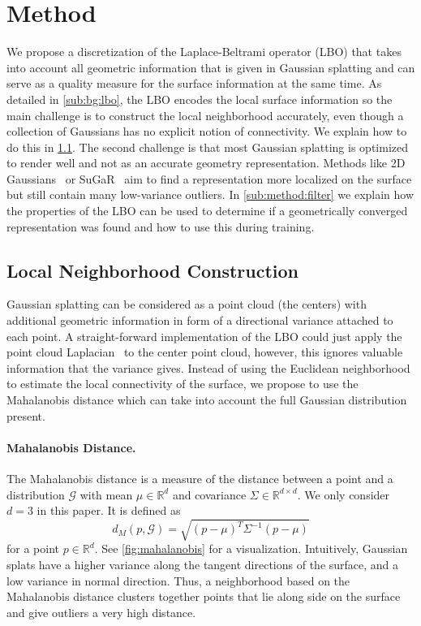 \section{Method}
\label{sec:method}

We propose a discretization of the Laplace-Beltrami operator (LBO) that takes into account all geometric information that is given in Gaussian splatting and can serve as a quality measure for the surface information at the same time. 
As detailed in \cref{sub:bg:lbo}, the LBO encodes the local surface information so the main challenge is to construct the local neighborhood accurately, even though a collection of Gaussians has no explicit notion of connectivity. 
We explain how to do this in \cref{sub:method:graph}.
The second challenge is that most Gaussian splatting is optimized to render well and not as an accurate geometry representation. 
Methods like 2D Gaussians~\cite{Huang2DGS2024} or SuGaR~\cite{guedon2023sugar} aim to find a representation more localized on the surface but still contain many low-variance outliers. 
In \cref{sub:method:filter} we explain how the properties of the LBO can be used to determine if a geometrically converged representation was found and how to use this during training. 

\subsection{Local Neighborhood Construction}\label{sub:method:graph}

Gaussian splatting can be considered as a point cloud (the centers) with additional geometric information in form of a directional variance attached to each point. 
A straight-forward implementation of the LBO could just apply the point cloud Laplacian~\cite{sharp2020nonmanifold} to the center point cloud, however, this ignores valuable information that the variance gives. 
Instead of using the Euclidean neighborhood to estimate the local connectivity of the surface, we propose to use the Mahalanobis distance which can take into account the full Gaussian distribution present.

\paragraph{Mahalanobis Distance.} %
The Mahalanobis distance is a measure of the distance between a point and a distribution $\mathcal{G}$ with mean $\mu \in \mathbb{R}^d$ and covariance $\Sigma \in \mathbb{R}^{d \times d}$.
We only consider $d=3$ in this paper.
It is defined as
$$d_{M}(p, \mathcal{G})=\sqrt{(p-\mu)^T\Sigma^{-1}(p-\mu)}$$ 
for a point $p \in \mathbb{R}^d$.
See \cref{fig:mahalanobis} for a visualization.
Intuitively, Gaussian splats have a higher variance along the tangent directions of the surface, and a low variance in normal direction.
Thus, a neighborhood based on the Mahalanobis distance clusters together points that lie along side on the surface and give outliers a very high distance. 

